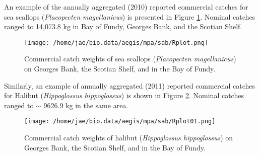 \documentclass[letterpaper,portrait,11pt]{scrartcl}
\numberwithin{equation}{section}    %
\numberwithin{figure}{section}    %
\numberwithin{table}{section}       %
\begin{document}
An example of the annually aggregated (2010) reported commercial catches for sea scallops (\textit{Placopecten magellanicus}) is presented in Figure \ref{fig:Scallop}. Nominal catches ranged to 14,073.8  kg in Bay of Fundy, Georges Bank, and the Scotian Shelf.











\begin{figure}[h]
	\centering
  \texttt{[image: /home/jae/bio.data/aegis/mpa/sab/Rplot.png]}
	\caption{Commercial catch weights of sea scallops (\textit{Placopecten magellanicus}) on Georges Bank, the Scotian Shelf, and in the Bay of Fundy.}
  \label{fig:Scallop}
\end{figure}


Similarly, an example of annually aggregated (2011) reported commercial catches for Halibut (\textit{Hippoglossus hippoglossus}) is shown in Figure \ref{fig:halibut}.  Nominal catches ranged to $\sim$ 9626.9 kg in the same area.



\begin{figure}[h]
	\centering
	\texttt{[image: /home/jae/bio.data/aegis/mpa/sab/Rplot01.png]}
	\caption{Commercial catch weights of halibut (\textit{Hippoglossus hippoglossus}) on Georges Bank, the Scotian Shelf, and in the Bay of Fundy.}
	\label{fig:halibut}
\end{figure}
\end{document}
